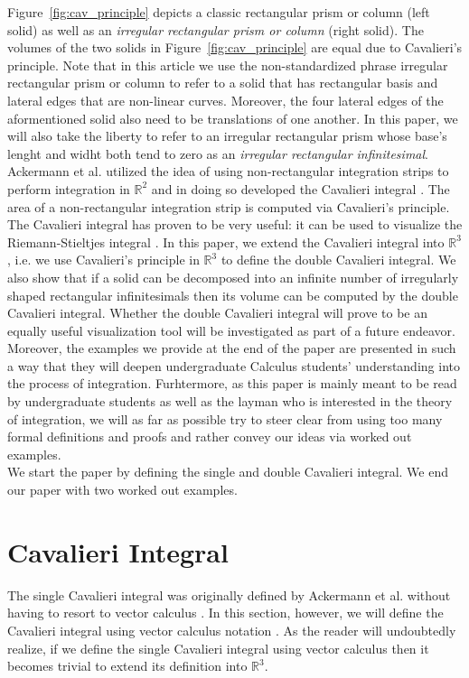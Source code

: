 \documentclass{article}
\theoremstyle{theorem}
\theoremstyle{definition}
\begin{document}
\noindent
Figure~\ref{fig:cav_principle} depicts a classic rectangular prism or column (left solid) as well as an \emph{irregular rectangular prism or column} (right solid). The volumes of the two solids in Figure~\ref{fig:cav_principle} are equal due 
to Cavalieri's principle. Note that in this article we use the non-standardized phrase irregular rectangular prism or column to refer to a solid that has rectangular 
basis and lateral edges that are non-linear curves. Moreover, the four lateral edges of the aformentioned solid also need to be translations of one another. In this paper, we will also take the liberty to refer to an irregular rectangular prism whose base's
lenght and widht both tend to zero as an \emph{irregular rectangular infinitesimal}. \\

\noindent
Ackermann et al. utilized the idea of using non-rectangular integration strips to perform integration in $\mathbb{R}^2$ and in doing so developed the Cavalieri integral \cite{ackermann12}. 
The area of a non-rectangular integration strip is computed via Cavalieri’s principle. The Cavalieri integral has proven to be very useful: it can be used to visualize the Riemann-Stieltjes integral \cite{grobler19}. In this paper, we extend the Cavalieri integral into $\mathbb{R}^3$, i.e. we use Cavalieri's principle in $\mathbb{R}^3$ to define the double 
Cavalieri integral. We also show that if a solid can be decomposed into an infinite number of irregularly shaped rectangular infinitesimals then its volume can be computed 
by the double Cavalieri integral. Whether the double Cavalieri integral will prove to be an equally useful visualization tool will be investigated as part of a future endeavor.
Moreover, the examples we provide at the end of the paper are presented in such a way that they will deepen undergraduate Calculus students' understanding into the 
process of integration. Furhtermore, as this paper is mainly meant to be read by undergraduate students as well as the layman who is interested in the theory of integration, we will as far as possible try to steer clear from using too many formal definitions and proofs and rather convey our ideas via worked out examples.\\ 

\noindent
We start the paper by defining the single and double Cavalieri integral. We end our paper with two worked out examples.

\section{Cavalieri Integral}
The single Cavalieri integral was originally defined by Ackermann et al. without having to resort to vector calculus \cite{ackermann12}. In this section, however, we will define the Cavalieri integral using vector calculus notation \cite{stewart1999}. As the reader will undoubtedly realize, if we define the single Cavalieri integral using vector calculus then it becomes trivial to
extend its definition into $\mathbb{R}^3$.\\
\end{document}
